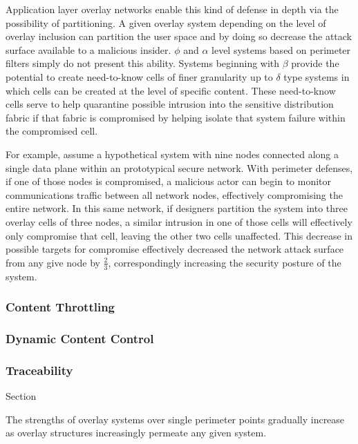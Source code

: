 Application layer overlay networks enable this kind of defense in depth via the possibility of partitioning.  A given overlay system depending on the level of overlay inclusion can partition the user space and by doing so decrease the attack surface available to a malicious insider.  $\phi$ and $\alpha$ level systems based on perimeter filters simply do not present this ability.  Systems beginning with $\beta$ provide the potential to create need-to-know cells of finer granularity up to $\delta$ type systems in which cells can be created at the level of specific content.  These need-to-know cells serve to help quarantine possible intrusion into the sensitive distribution fabric if that fabric is compromised by helping isolate that system failure within the compromised cell.

For example, assume a hypothetical system with nine nodes connected along a single data plane within an prototypical secure network.  With perimeter defenses, if one of those nodes is compromised, a malicious actor can begin to monitor communications traffic between all network nodes, effectively compromising the entire network.  In this same network, if designers partition the system into three overlay cells of three nodes, a similar intrusion in one of those cells will effectively only compromise that cell, leaving the other two cells unaffected.  This decrease in possible targets for compromise effectively decreased the network attack surface from any give node by $\frac{2}{3}$, correspondingly increasing the security posture of the system.

\subsubsection*{Content Throttling}

\subsubsection*{Dynamic Content Control}

\subsubsection*{Traceability}
Section

The strengths of overlay systems over single perimeter points gradually increase as overlay structures increasingly permeate any given system.